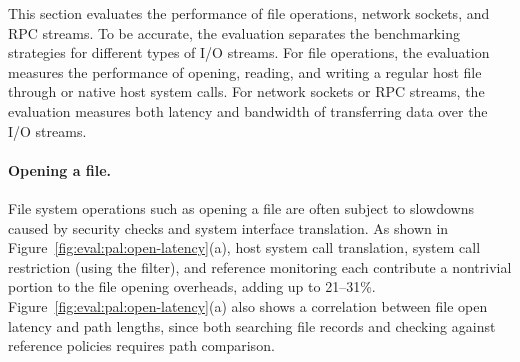 \label{sec:eval:pal:stream}

This section
evaluates the performance of
file operations, network sockets, and RPC streams.
To be accurate,
the evaluation separates the benchmarking strategies
for different types of I/O streams.
For file operations,
the evaluation
measures the performance of opening, reading, and writing a regular host file through \hostapis{} or native host system calls.
For network sockets or RPC streams,
the evaluation measures 
both latency and bandwidth of transferring data over the I/O streams.







\paragraph{Opening a file.}
File system operations such as opening a file
are often subject to
slowdowns caused by security checks and system interface translation.
As shown in Figure~\ref{fig:eval:pal:open-latency}(a),
host system call translation, system call restriction (using the \seccomp{} filter), and reference monitoring
each contribute a nontrivial portion to the file opening overheads,
adding up to 21--31\%.
Figure~\ref{fig:eval:pal:open-latency}(a)
also shows a correlation
between file open latency and path lengths,
since both searching file records and checking against reference policies
requires path comparison.




